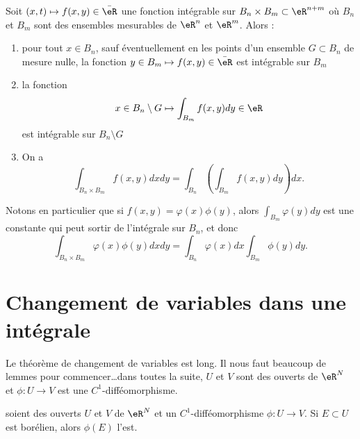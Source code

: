 \begin{theorem}[Fubini]\label{ThoFubini}
Soit $(x,t)\mapsto f(x,y)\in\bar \eR$ une fonction intégrable sur $B_n\times B_m\subset\eR^{n+m}$ où $B_n$ et $B_m$ sont des ensembles mesurables de $\eR^n$ et $\eR^m$. Alors :
\begin{enumerate}
\item pour tout $x\in B_n$, sauf éventuellement en les points d'un ensemble $G\subset B_n$ de mesure nulle, la fonction $y\in B_m\mapsto f(x,y)\in\bar\eR$ est intégrable sur $B_m$
\item
la fonction
\begin{equation}
	x\in B_n\setminus G\mapsto\int_{B_m}f(x,y)dy\in\eR
\end{equation}
est intégrable sur $B_n\setminus G$

\item 
On a
\begin{equation}
	\int_{B_n\times B_m}f(x,y)dxdy=\int_{B_n}\left( \int_{B_m}f(x,y)dy \right)dx.
\end{equation}

\end{enumerate}
\end{theorem}


Notons en particulier que si $f(x,y)=\varphi(x)\phi(y)$, alors $\int_{B_m}\varphi(y)dy$ est une constante qui peut sortir de l'intégrale sur $B_n$, et donc
\begin{equation}		\label{EqFubiniFactori}
	\int_{B_n\times B_m}\varphi(x)\phi(y)dxdy=\int_{B_n}\varphi(x)dx\int_{B_m}\phi(y)dy.
\end{equation}

\section{Changement de variables dans une intégrale}

Le théorème de changement de variables est long. Il nous faut beaucoup de lemmes pour commencer\ldots dans toutes la suite, \( U\) et \( V\) sont des ouverts de \( \eR^N\) et \( \phi\colon U\to V\) est une \( C^1\)-difféomorphisme.

\begin{lemma}
    soient des ouverts \( U\) et \( V\) de \( \eR^N\) et un \( C^1\)-difféomorphisme \( \phi\colon U\to V\). Si \( E\subset U\) est borélien, alors \( \phi(E)\) l'est.
\end{lemma}

